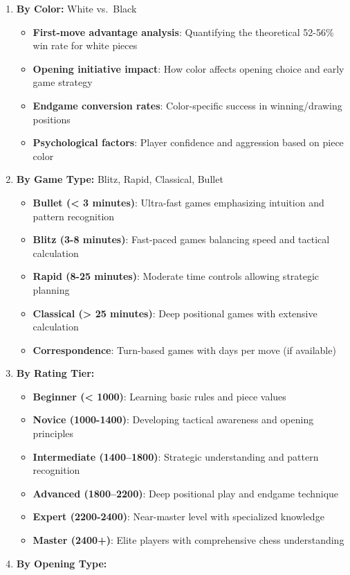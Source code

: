 \documentclass[
]{article}
\providecommand{\tightlist}{%
  \setlength{\itemsep}{0pt}\setlength{\parskip}{0pt}}
\begin{document}
\begin{enumerate}
\def\labelenumi{\arabic{enumi}.}
\tightlist
\item
  \textbf{By Color:} White vs.~Black

  \begin{itemize}
  \tightlist
  \item
    \textbf{First-move advantage analysis}: Quantifying the theoretical
    52-56\% win rate for white pieces
  \item
    \textbf{Opening initiative impact}: How color affects opening choice
    and early game strategy
  \item
    \textbf{Endgame conversion rates}: Color-specific success in
    winning/drawing positions
  \item
    \textbf{Psychological factors}: Player confidence and aggression
    based on piece color
  \end{itemize}
\item
  \textbf{By Game Type:} Blitz, Rapid, Classical, Bullet

  \begin{itemize}
  \tightlist
  \item
    \textbf{Bullet (\textless{} 3 minutes)}: Ultra-fast games
    emphasizing intuition and pattern recognition
  \item
    \textbf{Blitz (3-8 minutes)}: Fast-paced games balancing speed and
    tactical calculation
  \item
    \textbf{Rapid (8-25 minutes)}: Moderate time controls allowing
    strategic planning
  \item
    \textbf{Classical (\textgreater{} 25 minutes)}: Deep positional
    games with extensive calculation
  \item
    \textbf{Correspondence}: Turn-based games with days per move (if
    available)
  \end{itemize}
\item
  \textbf{By Rating Tier:}

  \begin{itemize}
  \tightlist
  \item
    \textbf{Beginner (\textless{} 1000)}: Learning basic rules and piece
    values
  \item
    \textbf{Novice (1000-1400)}: Developing tactical awareness and
    opening principles
  \item
    \textbf{Intermediate (1400--1800)}: Strategic understanding and
    pattern recognition
  \item
    \textbf{Advanced (1800--2200)}: Deep positional play and endgame
    technique
  \item
    \textbf{Expert (2200-2400)}: Near-master level with specialized
    knowledge
  \item
    \textbf{Master (2400+)}: Elite players with comprehensive chess
    understanding
  \end{itemize}
\item
  \textbf{By Opening Type:}


\end{enumerate}
\end{document}
